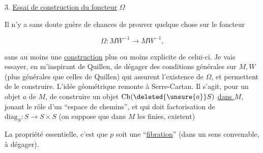 
3. \uline{Essai de construction du foncteur} $\Omega$

Il n'y a sans doute guère de chances de prouver quelque chose sur le foncteur

\[
 \Omega:MW^{-1}\longrightarrow MW^{-1},
\]

sans  au moins une \uline{construction} plus ou moins explicite de celui-ci. Je vais essayer,  en m'inspirant de Quillen, de dégager des conditions générales sur $M,W$ (plus générales que celles de Quillen) qui assurent l'existence de $\Omega$, et permettent de le construire. L'idée géométrique remonte à Serre-Cartan.  Il s'agit, pour un objet $a$ de $M$, de construire un objet  $\mathrm{Ch}(\deleted{\unsure{a}}S)$ \uline{dans $M$}, jouant le rôle d'un  ``espace de chemins'', et qui doit   factorisation de \deleted{\unsure{\(\Delta\)}} $\mathrm{diag}_S:S\longrightarrow S\times S$ (on suppose que dans $M$ les   finies,  existent)


La propriété essentielle, c'est que $p$ soit une ``\uline{fibration}'' (dans un sens convenable, à dégager).
